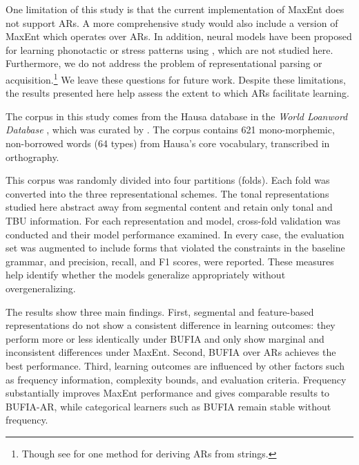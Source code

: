 One limitation of this study is that the current implementation of
MaxEnt does not support ARs.  A more comprehensive study would also
include a version of MaxEnt which operates over ARs.  In addition,
neural models have been proposed for learning phonotactic or stress
patterns using
\citep{goldsmith94,mayer2020phonotactic,prickett2025learning}, which
are not studied here. Furthermore, we do not address the problem of
representational parsing or acquisition.\footnote{Though see
\citet{jardine2015concatenation} for one method for deriving ARs from
strings.} We leave these questions for future work.  Despite these
limitations, the results presented here help assess the extent to
which ARs facilitate learning.

The corpus in this study comes from the Hausa database in the
\textit{World Loanword Database} \citep{wold-4}, which was curated by
\citet{li2025learning}. The corpus contains 621 mono-morphemic,
non-borrowed words (64 types) from Hausa's core vocabulary,
transcribed in orthography.

This corpus was randomly divided into four partitions (folds).
Each fold was converted into the three representational schemes.
The tonal representations studied here abstract away from segmental content and
retain only tonal and TBU information.
For each representation and model, cross-fold validation was conducted and
their model performance examined.
In every case, the evaluation set was augmented to include forms
that violated the constraints in the baseline grammar,
and precision, recall, and F1 scores, were reported.
These measures help identify whether the models generalize appropriately without overgeneralizing.

The results show three main findings. First, segmental and
feature-based representations do not show a consistent
difference in learning outcomes: they perform more or less identically
under BUFIA and only show marginal and inconsistent differences
under MaxEnt. Second, BUFIA over ARs achieves the best performance.
Third, learning
outcomes are influenced by other factors such as frequency
information, complexity bounds, and evaluation criteria.
Frequency substantially improves MaxEnt performance and gives
comparable results to BUFIA-AR, while categorical learners such
as BUFIA remain stable without frequency.

